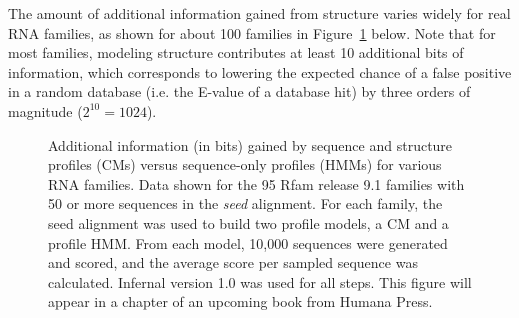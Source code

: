 \documentclass[custom,landscape,final,30pt,plainboxedsections]{sciposter-titleskipsmall}
\begin{document}
\begin{multicols}{3}
The amount of additional information gained from structure varies
widely for real RNA families, as shown for about 100 families in
Figure~\ref{fig:avgscores} below. 
Note that for most families, modeling structure contributes at least
10 additional bits of information, which corresponds to lowering the
expected chance of a false positive in a random database (i.e. the
E-value of a database hit) by three orders of magnitude
($2^{10}=1024$).

\begin{footnotesize}
\begin{figure}
\caption{Additional information (in bits) gained by sequence and
  structure profiles (CMs) versus sequence-only profiles (HMMs) for
  various RNA families.  
  Data shown for the 95 Rfam release 9.1 families
  with 50 or more sequences in the \emph{seed} alignment. For each
  family, the seed alignment was used to build two profile models, a
  CM and a profile HMM. From each model, 10,000 sequences were
  generated and scored, and the average score per sampled sequence was
  calculated. Infernal version 1.0 was used for all steps.
  This figure will appear in a chapter of an upcoming book from Humana Press.
}
\label{fig:avgscores}
\end{figure}
\end{footnotesize}


\end{multicols}
\end{document}
